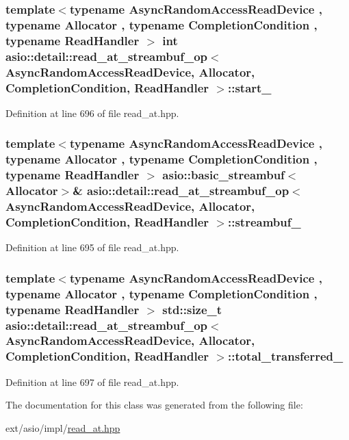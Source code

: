 \subsubsection[{start\+\_\+}]{\setlength{\rightskip}{0pt plus 5cm}template$<$typename Async\+Random\+Access\+Read\+Device , typename Allocator , typename Completion\+Condition , typename Read\+Handler $>$ int {\bf asio\+::detail\+::read\+\_\+at\+\_\+streambuf\+\_\+op}$<$ Async\+Random\+Access\+Read\+Device, Allocator, Completion\+Condition, Read\+Handler $>$\+::start\+\_\+}\label{classasio_1_1detail_1_1read__at__streambuf__op_aff5cf4e15b32e09e234e86edc88d2a91}


Definition at line 696 of file read\+\_\+at.\+hpp.

\hypertarget{classasio_1_1detail_1_1read__at__streambuf__op_affc19956d03f90f8f1874a862ebeb637}{}
\subsubsection[{streambuf\+\_\+}]{\setlength{\rightskip}{0pt plus 5cm}template$<$typename Async\+Random\+Access\+Read\+Device , typename Allocator , typename Completion\+Condition , typename Read\+Handler $>$ {\bf asio\+::basic\+\_\+streambuf}$<$Allocator$>$\& {\bf asio\+::detail\+::read\+\_\+at\+\_\+streambuf\+\_\+op}$<$ Async\+Random\+Access\+Read\+Device, Allocator, Completion\+Condition, Read\+Handler $>$\+::streambuf\+\_\+}\label{classasio_1_1detail_1_1read__at__streambuf__op_affc19956d03f90f8f1874a862ebeb637}


Definition at line 695 of file read\+\_\+at.\+hpp.

\hypertarget{classasio_1_1detail_1_1read__at__streambuf__op_a98c198133eaab6a3ed97775658246976}{}
\subsubsection[{total\+\_\+transferred\+\_\+}]{\setlength{\rightskip}{0pt plus 5cm}template$<$typename Async\+Random\+Access\+Read\+Device , typename Allocator , typename Completion\+Condition , typename Read\+Handler $>$ std\+::size\+\_\+t {\bf asio\+::detail\+::read\+\_\+at\+\_\+streambuf\+\_\+op}$<$ Async\+Random\+Access\+Read\+Device, Allocator, Completion\+Condition, Read\+Handler $>$\+::total\+\_\+transferred\+\_\+}\label{classasio_1_1detail_1_1read__at__streambuf__op_a98c198133eaab6a3ed97775658246976}


Definition at line 697 of file read\+\_\+at.\+hpp.



The documentation for this class was generated from the following file\+:\begin{DoxyCompactItemize}
\item 
ext/asio/impl/\hyperlink{impl_2read__at_8hpp}{read\+\_\+at.\+hpp}\end{DoxyCompactItemize}
